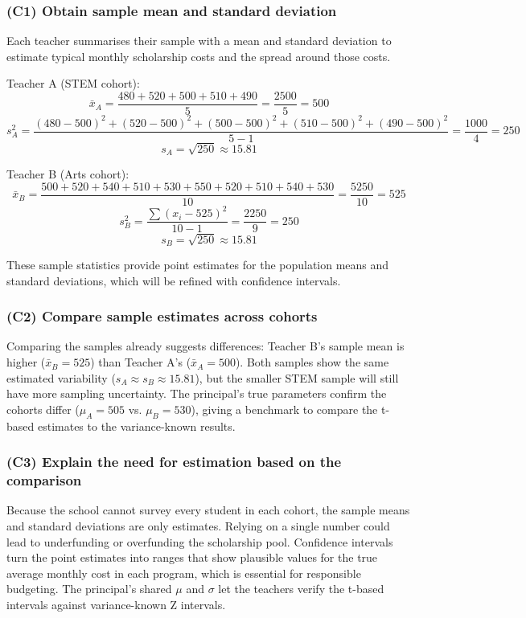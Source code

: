 \subsubsection{(C1) Obtain sample mean and standard deviation}\label{subsubsec:interval-example1-1-c1}

Each teacher summarises their sample with a mean and standard deviation to estimate typical monthly scholarship costs and the spread around those costs.

Teacher A (STEM cohort):
\[
\bar{x}_A = \frac{480 + 520 + 500 + 510 + 490}{5} = \frac{2500}{5} = 500
\]
\[
 s_A^2 = \frac{(480-500)^2 + (520-500)^2 + (500-500)^2 + (510-500)^2 + (490-500)^2}{5-1}
= \frac{1000}{4} = 250
\]
\[
 s_A = \sqrt{250} \approx 15.81
\]

Teacher B (Arts cohort):
\[
\bar{x}_B = \frac{500 + 520 + 540 + 510 + 530 + 550 + 520 + 510 + 540 + 530}{10}
= \frac{5250}{10} = 525
\]
\[
 s_B^2 = \frac{\sum (x_i - 525)^2}{10-1}
= \frac{2250}{9} = 250
\]
\[
 s_B = \sqrt{250} \approx 15.81
\]

These sample statistics provide point estimates for the population means and standard deviations, which will be refined with confidence intervals.

\subsubsection{(C2) Compare sample estimates across cohorts}\label{subsubsec:interval-example1-1-c2}

Comparing the samples already suggests differences: Teacher B's sample mean is higher (\(\bar{x}_B = 525\)) than Teacher A's (\(\bar{x}_A = 500\)). Both samples show the same estimated variability (\(s_A \approx s_B \approx 15.81\)), but the smaller STEM sample will still have more sampling uncertainty. The principal's true parameters confirm the cohorts differ (\(\mu_A = 505\) vs. \(\mu_B = 530\)), giving a benchmark to compare the t-based estimates to the variance-known results.

\subsubsection{(C3) Explain the need for estimation based on the comparison}\label{subsubsec:interval-example1-1-c3}

Because the school cannot survey every student in each cohort, the sample means and standard deviations are only estimates. Relying on a single number could lead to underfunding or overfunding the scholarship pool. Confidence intervals turn the point estimates into ranges that show plausible values for the true average monthly cost in each program, which is essential for responsible budgeting. The principal's shared \(\mu\) and \(\sigma\) let the teachers verify the t-based intervals against variance-known Z intervals.

